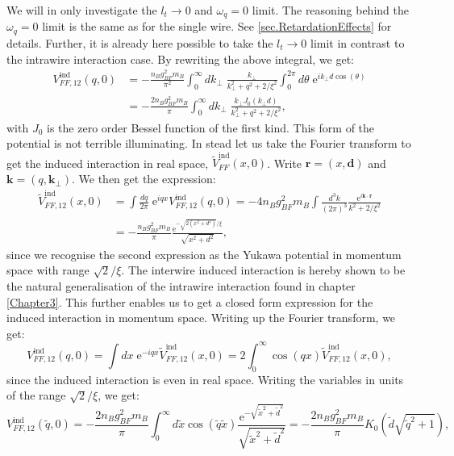 We will in only investigate the $l_t \to 0$ and $\omega_q = 0$ limit. The reasoning behind the $\omega_q = 0$ limit is the same as for the single wire. See \ref{sec.RetardationEffects} for details. Further, it is already here possible to take the $l_t \to 0$ limit in contrast to the intrawire interaction case. By rewriting the above integral, we get:
\begin{align}
V_{FF,12}^\text{ind}(q,0) &= -\frac{n_Bg_{BF}^2m_B}{\pi^2}\int_0^\infty d k_\perp \; \frac{k_\perp}{k_\perp^2 + q^2 + 2/\xi^2} \int_0^{2\pi} d\theta \; \text{e}^{ik_\perp d\cos(\theta)} \nonumber \\
						  &= -\frac{2n_Bg_{BF}^2m_B}{\pi}\int_0^\infty d k_\perp \; \frac{k_\perp J_0(k_\perp d)}{k_\perp^2 + q^2 + 2/\xi^2},
\label{eq.secondwireinducedinteractionmomentumspaceintegralexpression}
\end{align}
with $J_0$ is the zero order Bessel function of the first kind. This form of the potential is not terrible illuminating. In stead let us take the Fourier transform to get the induced interaction in real space, $\tilde{V}^\text{ind}_{FF}(x,0)$. Write $\mathbf{r} = (x,\mathbf{d})$ and $\mathbf{k} = (q,\mathbf{k}_\perp)$. We then get the expression:
\begin{align}
\tilde{V}_{FF,12}^\text{ind}(x,0) &= \int \frac{dq}{2\pi} \; \text{e}^{iqx} V_{FF,12}^\text{ind}(q,0) = -4n_Bg^2_{BF}m_B\int \frac{d^3k}{(2\pi)^3} \frac{\text{e}^{i\mathbf{k}\cdot \mathbf{r}}}{k^2 + 2/\xi^2} \nonumber \\
								  &= -\frac{n_Bg^2_{BF}m_B}{\pi} \frac{\text{e}^{-\sqrt{2(x^2+d^2)}/\xi}}{\sqrt{x^2+d^2}},
\end{align}
since we recognise the second expression as the Yukawa potential in momentum space with range $\sqrt{2}/\xi$. The interwire induced interaction is hereby shown to be the natural generalisation of the intrawire interaction found in chapter \ref{Chapter3}. This further enables us to get a closed form expression for the induced interaction in momentum space. Writing up the Fourier transform, we get:
\begin{equation}
V^\text{ind}_{FF,12}(q,0) = \int dx \; \text{e}^{-iqx}\tilde{V}^\text{ind}_{FF,12}(x,0) = 2\int_0^\infty \cos(qx)\tilde{V}^\text{ind}_{FF,12}(x,0), \nonumber 
\end{equation}
since the induced interaction is even in real space. Writing the variables in units of the range $\sqrt{2}/\xi$, we get:
\begin{equation}
V^\text{ind}_{FF,12}(\tilde{q},0) = -\frac{2n_Bg^2_{BF}m_B}{\pi}\int_0^\infty d\tilde{x} \cos(\tilde{q}\tilde{x})\frac{ \text{e}^{ -\sqrt{\tilde{x}^2+\tilde{d}^2} } }{\sqrt{\tilde{x}^2+\tilde{d}^2}} = -\frac{2n_Bg^2_{BF}m_B}{\pi}K_0\left(\tilde{d}\sqrt{\tilde{q}^2+1}\right), \nonumber
\end{equation}
